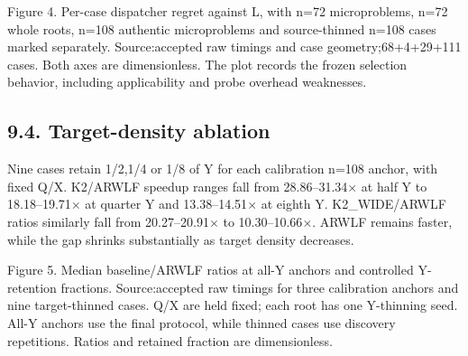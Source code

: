 \documentclass[10pt,letterpaper]{article}
\begin{document}
{\small\color{teal}Figure 4. Per-case dispatcher regret against L, with n=72 microproblems, n=72 whole roots, n=108 authentic microproblems and source-thinned n=108 cases marked separately. Source:accepted raw timings and case geometry;68+4+29+111 cases. Both axes are dimensionless. The plot records the frozen selection behavior, including applicability and probe overhead weaknesses.\par}

\subsection*{9.4. Target-density ablation}

Nine cases retain 1/2,1/4 or 1/8 of Y for each calibration n=108 anchor, with fixed Q/X. K2/ARWLF speedup ranges fall from 28.86--31.34\ensuremath{\times} at half Y to 18.18--19.71\ensuremath{\times} at quarter Y and 13.38--14.51\ensuremath{\times} at eighth Y. K2\_WIDE/ARWLF ratios similarly fall from 20.27--20.91\ensuremath{\times} to 10.30--10.66\ensuremath{\times}. ARWLF remains faster, while the gap shrinks substantially as target density decreases.



\begin{center}
\end{center}


{\small\color{teal}Figure 5. Median baseline/ARWLF ratios at all-Y anchors and controlled Y-retention fractions. Source:accepted raw timings for three calibration anchors and nine target-thinned cases. Q/X are held fixed; each root has one Y-thinning seed. All-Y anchors use the final protocol, while thinned cases use discovery repetitions. Ratios and retained fraction are dimensionless.\par}
\end{document}
